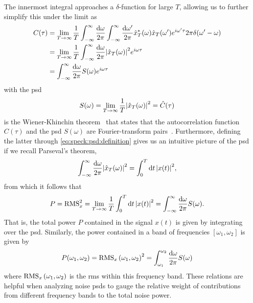 The innermost integral approaches a $\delta$-function for large $T$, allowing us to further simplify this under the limit as
\begin{align}
    C(\tau) &= \lim_{T\to\infty} \frac{1}{T}\int_{-\infty}^{\infty}\frac{\dd{\omega}}{2\pi}\int_{-\infty}^{\infty}\frac{\dd{\omega^\prime}}{2\pi}
                \hat{x}_T^\ast(\omega)\hat{x}_T(\omega^\prime)
                e^{i\omega^\prime\tau} 2\pi\delta(\omega^\prime - \omega) \\
            &= \lim_{T\to\infty}\frac{1}{T}
                \int_{-\infty}^{\infty}\frac{\dd{\omega}}{2\pi}\abs{\hat{x}_T(\omega)}^2 e^{i\omega\tau} \\
            &= \int_{-\infty}^{\infty}\frac{\dd{\omega}}{2\pi} S(\omega) e^{i\omega\tau} \label{eq:speck:wiener_khinchin}
\end{align}
\clearpage
with the \acrfull{psd}
\begin{equation}
    S(\omega) = \lim_{T\to\infty}\frac{1}{T}\abs{\hat{x}_T(\omega)}^2 = \hat{C}(\tau) \label{eq:speck:psd:definition}
\end{equation}
 is the Wiener-Khinchin theorem~\cite{Wiener1930,Khintchine1934} that states that the autocorrelation function $C(\tau)$ and the \gls{psd} $S(\omega)$ are Fourier-transform pairs~\cite{Koopmans1995}.
Furthermore, defining the latter through \cref{eq:speck:psd:definition} gives us an intuitive picture of the \gls{psd} if we recall Parseval's theorem,
\begin{align}\label{eq:speck:parseval}
    \int_{-\infty}^{\infty}\frac{\dd{\omega}}{2\pi}\abs{\hat{x}_T(\omega)}^2 = \int_{0}^{T}\dd{t}\abs{x(t)}^2,
\end{align}
from which it follows that
\begin{equation}
    P = \operatorname{RMS}_x^2 = \lim_{T\to\infty}\frac{1}{T}\int_0^T\dd{t}\abs{x(t)}^2 = \int_{-\infty}^{\infty}\frac{\dd{\omega}}{2\pi} S(\omega).
\end{equation}
That is, the total power $P$ contained in the signal $x(t)$ is given by integrating over the \gls{psd}.
Similarly, the power contained in a band of frequencies $[\omega_1, \omega_2]$ is given by
\begin{align}
    P(\omega_1, \omega_2) = \operatorname{RMS}_x\left(\omega_1, \omega_2\right)^2 = \int_{\omega_1}^{\omega_2}\frac{\dd{\omega}}{2\pi} S(\omega) \label{eq:speck:psd:bandpower}
\end{align}
where $\operatorname{RMS}_x\left(\omega_1, \omega_2\right)$ is the \acrlong{rms} within this frequency band.
These relations are helpful when analyzing noise \glspl{psd} to gauge the relative weight of contributions from different frequency bands to the total noise power.

